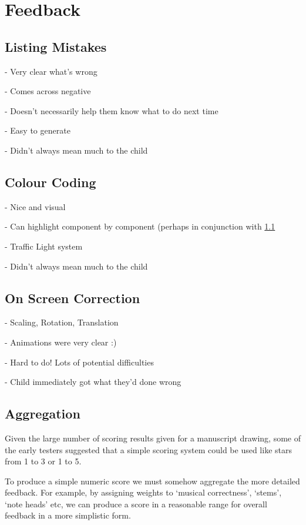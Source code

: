 \section{Feedback}

\subsection{Listing Mistakes}
\label{sec:feedback-listing}

- Very clear what's wrong

- Comes across negative

- Doesn't necessarily help them know what to do next time

- Easy to generate

- Didn't always mean much to the child

\subsection{Colour Coding}

- Nice and visual

- Can highlight component by component (perhaps in conjunction with \cref{sec:feedback-listing}

- Traffic Light system

- Didn't always mean much to the child

\subsection{On Screen Correction}

- Scaling, Rotation, Translation

- Animations were very clear :)

- Hard to do! Lots of potential difficulties

- Child immediately got what they'd done wrong

\subsection{Aggregation}
Given the large number of scoring results given for a manuscript drawing, some of the early testers suggested that a simple scoring system could be used like stars from 1 to 3 or 1 to 5.

To produce a simple numeric score we must somehow aggregate the more detailed feedback. For example, by assigning weights to `musical correctness', `stems', `note heads' etc, we can produce a score in a reasonable range for overall feedback in a more simplistic form.

